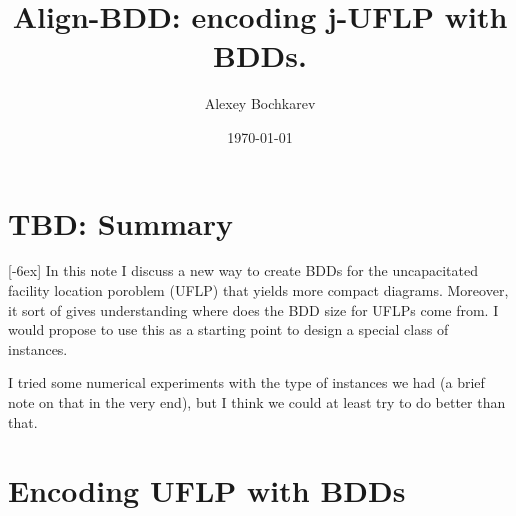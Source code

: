 \documentclass[11pt]{article}
\author{Alexey Bochkarev}
\date{\today}
\title{Align-BDD: encoding j-UFLP with BDDs.}
\begin{document}
\maketitle

\section{TBD: Summary}
\label{sec:orgcf53b13}
[-6ex]
In this note I discuss a new way to create BDDs for the uncapacitated facility
location poroblem (UFLP) that yields more compact diagrams. Moreover, it sort of
gives understanding where does the BDD size for UFLPs come from. I would propose
to use this as a starting point to design a special class of instances.

I tried some numerical experiments with the type of instances we had (a brief
  note on that in the very end), but I think we could at least try to do better
  than that. 

\section{Encoding UFLP with BDDs}
\label{sec:org1ef59f4}
\end{document}
